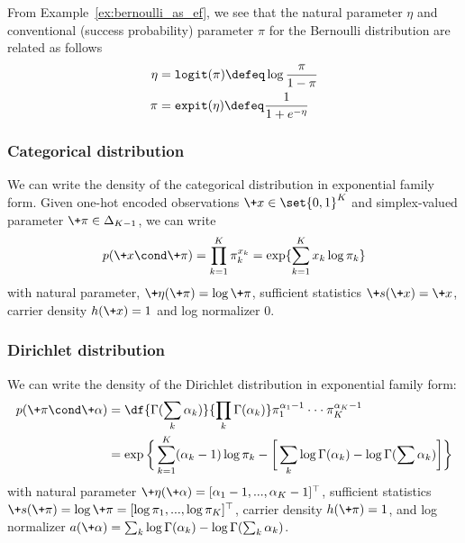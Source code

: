\documentclass{article} %
\newcommand{\obs}{\+x}
\newcommand{\obsScalar}{x}
\newcommand{\logNormalizerFunction}{a}
\newcommand{\sufficientStatsFunction}{\+s}
\newcommand{\carrierDensity}{h}
\newcommand{\naturalParam}{\+\eta}
\newcommand{\naturalParamScalar}{\eta}
\begin{document}
\begin{remark}
From Example~\ref{ex:bernoulli_as_ef}, we see that the natural parameter $\naturalParamScalar$ and conventional (success probability) parameter $\pi$ for the Bernoulli distribution are related as follows
 \begin{align*}
 \naturalParamScalar &= \texttt{logit}(\pi) \defeq \log \frac{\pi}{1-\pi} \\	
  \pi &= \texttt{expit}( \naturalParamScalar) \defeq \frac{1}{1+e^{- \naturalParamScalar}} \\	
 \end{align*}
%
\end{remark}


\subsubsection{Categorical distribution}

\begin{example}
 We can write the density of the categorical distribution in exponential family form. 	 Given one-hot encoded observations $\obs \in \set{0,1}^K$ and simplex-valued parameter $\+\pi \in \Delta_{K-1}$, we can write
\[p(\obs \cond \+\pi) = \prod_{k=1}^K \pi_k^{\obsScalar_k} = \exp \{ \sum_{k=1}^K \obsScalar_k \log \pi_k\} \]
 with natural parameter, $\naturalParam(\+\pi) = \log \+\pi$, sufficient statistics $\sufficientStatsFunction(\obs) = \obs$, carrier density $\carrierDensity(\obs)=1$ and log normalizer $0$.
\label{ex:categorical_as_ef}
\end{example}

\subsubsection{Dirichlet distribution}
\begin{example} 
 We can write the density of the Dirichlet distribution in exponential family form:
\begin{align*}
p (\+\pi \cond \+\alpha) &= \df{\Gamma(\sum_k \alpha_k)}{\prod_k \Gamma (\alpha_k) } \pi_1^{\alpha_1 -1} \cdot \cdot \cdot \pi_K^{\alpha_K -1} \\
&= \exp \bigg\{ \sum_{k=1}^K (\alpha_k -1) \log \pi_k - \bigg[ \sum_k \log \Gamma (\alpha_k)-  \log \Gamma (\sum \alpha_k) \bigg]  \bigg\}
\end{align*}
with natural parameter $\naturalParam(\+\alpha) = [\alpha_1 -1, ..., \alpha_K -1]^\top$, sufficient statistics $\sufficientStatsFunction(\+\pi) = \log \+\pi = [\log \pi_1, ..., \log \pi_K]^\top$, carrier density $\carrierDensity(\+\pi)=1$, and log normalizer $\logNormalizerFunction(\+\alpha) =  \sum_k \log \Gamma (\alpha_k ) - \log \Gamma (\sum_k \alpha_k)$. 
\label{ex:dirichlet_as_ef} 
\end{example} 
\end{document}
